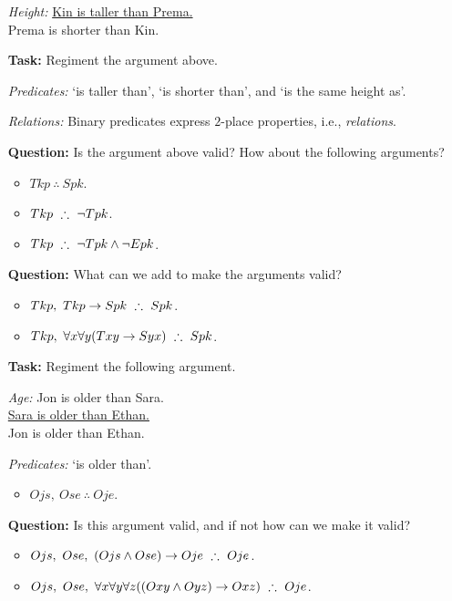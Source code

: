 \documentclass[a4paper, 11pt]{article} %
\begin{document}
\begin{enumerate}
  \item[\it Height:]
    \underline{Kin is taller than Prema.\quad}\\ 
    Prema is shorter than Kin.
  \item[\bf Task:] Regiment the argument above.
  \item[\it Predicates:] `is taller than', `is shorter than', and `is the same height as'.
  \item[\it Relations:] Binary predicates express $2$-place properties, i.e., \textit{relations}. 
  \item[\bf Question:] Is the argument above valid? How about the following arguments?
    \begin{itemize}
      \item $Tkp\ \therefore\ Spk$.
      \item $Tkp\ \therefore\ \neg Tpk$.
      \item $Tkp\ \therefore\ \neg Tpk \wedge \neg Epk$.
    \end{itemize}
  \item[\bf Question:] What can we add to make the arguments valid?
    \begin{itemize}
      \item $Tkp,\ Tkp \eif Spk\ \therefore\ Spk$.
      \item $Tkp,\ \forall x \forall y(Txy \rightarrow Syx)\ \therefore\ Spk$.
    \end{itemize}
  \item[\bf Task:] Regiment the following argument.
  \item[\it Age:] 
    Jon is older than Sara.\\ 
    \underline{Sara is older than Ethan.\quad}\\
    Jon is older than Ethan.
  \item[\it Predicates:] `is older than'.
    \begin{itemize}
      \item $Ojs,\ Ose\ \therefore\ Oje$.
    \end{itemize}
  \item[\bf Question:] Is this argument valid, and if not how can we make it valid?
    \begin{itemize}
      \item $Ojs,\ Ose,\ (Ojs \eand Ose) \eif Oje\ \therefore\ Oje$.
      \item $Ojs,\ Ose,\ \forall x \forall y \forall z((Oxy \wedge Oyz) \rightarrow Oxz)\ \therefore\ Oje$.
    \end{itemize}
\end{enumerate}
\end{document}

